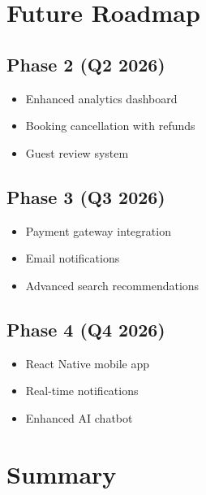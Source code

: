 \documentclass[12pt, a4paper, oneside]{report}
\begin{document}
\chapter{Future Roadmap}

\section{Phase 2 (Q2 2026)}
\begin{itemize}
  \item Enhanced analytics dashboard
  \item Booking cancellation with refunds
  \item Guest review system
\end{itemize}

\section{Phase 3 (Q3 2026)}
\begin{itemize}
  \item Payment gateway integration
  \item Email notifications
  \item Advanced search recommendations
\end{itemize}

\section{Phase 4 (Q4 2026)}
\begin{itemize}
  \item React Native mobile app
  \item Real-time notifications
  \item Enhanced AI chatbot
\end{itemize}


\clearpage

\chapter*{Summary}
\end{document}
